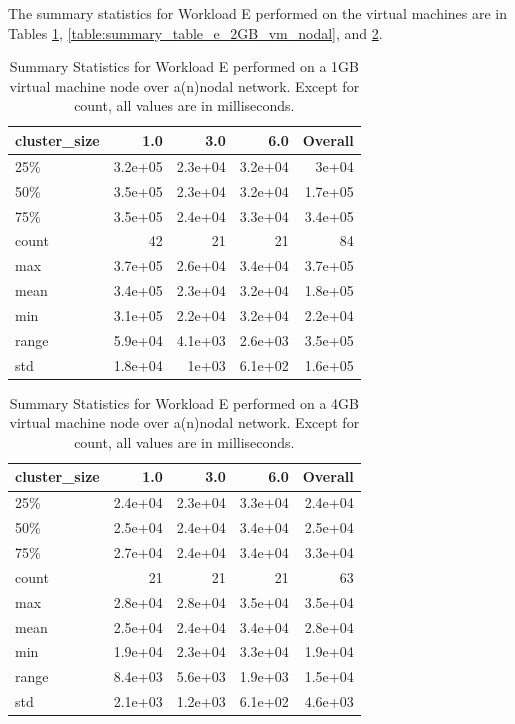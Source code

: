 The summary statistics for Workload E performed on the virtual machines are in Tables \ref{table:summary_table_e_1GB_vm_nodal}, \ref{table:summary_table_e_2GB_vm_nodal}, and \ref{table:summary_table_e_4GB_vm_nodal}.
\begin{table}
\begin{tabular}{lrrrr}
\toprule
cluster\_size &     1.0 &     3.0 &     6.0 &  Overall \\
\midrule
25\%   & 3.2e+05 & 2.3e+04 & 3.2e+04 &    3e+04 \\
50\%   & 3.5e+05 & 2.3e+04 & 3.2e+04 &  1.7e+05 \\
75\%   & 3.5e+05 & 2.4e+04 & 3.3e+04 &  3.4e+05 \\
count &      42 &      21 &      21 &       84 \\
max   & 3.7e+05 & 2.6e+04 & 3.4e+04 &  3.7e+05 \\
mean  & 3.4e+05 & 2.3e+04 & 3.2e+04 &  1.8e+05 \\
min   & 3.1e+05 & 2.2e+04 & 3.2e+04 &  2.2e+04 \\
range & 5.9e+04 & 4.1e+03 & 2.6e+03 &  3.5e+05 \\
std   & 1.8e+04 &   1e+03 & 6.1e+02 &  1.6e+05 \\
\bottomrule
\end{tabular}
\caption{Summary Statistics for Workload E performed on a 1GB virtual machine node over a(n)nodal network.  Except for count, all values are in milliseconds.}
\label{table:summary_table_e_1GB_vm_nodal}
\end{table}

\begin{table}
\begin{tabular}{lrrrr}
\toprule
cluster\_size &     1.0 &     3.0 &     6.0 &  Overall \\
\midrule
25\%   & 2.4e+04 & 2.3e+04 & 3.3e+04 &  2.4e+04 \\
50\%   & 2.5e+04 & 2.4e+04 & 3.4e+04 &  2.5e+04 \\
75\%   & 2.7e+04 & 2.4e+04 & 3.4e+04 &  3.3e+04 \\
count &      21 &      21 &      21 &       63 \\
max   & 2.8e+04 & 2.8e+04 & 3.5e+04 &  3.5e+04 \\
mean  & 2.5e+04 & 2.4e+04 & 3.4e+04 &  2.8e+04 \\
min   & 1.9e+04 & 2.3e+04 & 3.3e+04 &  1.9e+04 \\
range & 8.4e+03 & 5.6e+03 & 1.9e+03 &  1.5e+04 \\
std   & 2.1e+03 & 1.2e+03 & 6.1e+02 &  4.6e+03 \\
\bottomrule
\end{tabular}
\caption{Summary Statistics for Workload E performed on a 4GB virtual machine node over a(n)nodal network.  Except for count, all values are in milliseconds.}
\label{table:summary_table_e_4GB_vm_nodal}
\end{table}




